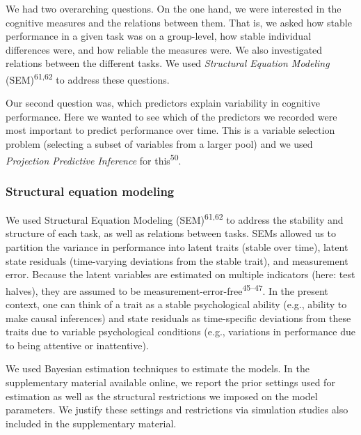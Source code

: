 \documentclass[
  man,floatsintext]{apa6}
\begin{document}
We had two overarching questions. On the one hand, we were interested in the cognitive measures and the relations between them. That is, we asked how stable performance in a given task was on a group-level, how stable individual differences were, and how reliable the measures were. We also investigated relations between the different tasks. We used \emph{Structural Equation Modeling} (SEM)\textsuperscript{61,62} to address these questions.

Our second question was, which predictors explain variability in cognitive performance. Here we wanted to see which of the predictors we recorded were most important to predict performance over time. This is a variable selection problem (selecting a subset of variables from a larger pool) and we used \emph{Projection Predictive Inference} for this\textsuperscript{50}.

\hypertarget{structural-equation-modeling}{%
\subsubsection{Structural equation modeling}\label{structural-equation-modeling}}

We used Structural Equation Modeling (SEM)\textsuperscript{61,62} to address the stability and structure of each task, as well as relations between tasks. SEMs allowed us to partition the variance in performance into latent traits (stable over time), latent state residuals (time-varying deviations from the stable trait), and measurement error. Because the latent variables are estimated on multiple indicators (here: test halves), they are assumed to be measurement-error-free\textsuperscript{45--47}. In the present context, one can think of a trait as a stable psychological ability (e.g., ability to make causal inferences) and state residuals as time-specific deviations from these traits due to variable psychological conditions (e.g., variations in performance due to being attentive or inattentive).

We used Bayesian estimation techniques to estimate the models. In the supplementary material available online, we report the prior settings used for estimation as well as the structural restrictions we imposed on the model parameters. We justify these settings and restrictions via simulation studies also included in the supplementary material.
\end{document}
